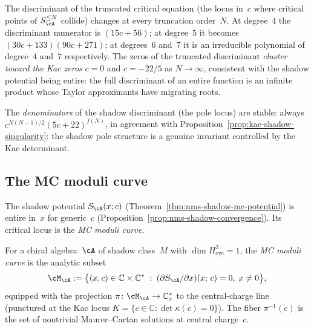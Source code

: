 \begin{remark}
\label{rem:nms-discriminant-instability}%
%
The discriminant of the truncated critical equation (the locus
in~$c$ where critical points of $S_{\cA}^{\leq N}$ collide)
changes at every truncation order~$N$. At degree~$4$ the discriminant
numerator is $(15c + 56)$; at degree~$5$ it becomes
$(30c + 133)(90c + 271)$; at degrees~$6$ and~$7$ it is an
irreducible polynomial of degree~$4$ and~$7$ respectively.
The zeros of the truncated discriminant \emph{cluster toward
the Kac zeros} $c = 0$ and $c = -22/5$ as $N \to \infty$,
consistent with the shadow potential being entire: the full
discriminant of an entire function is an infinite product whose
Taylor approximants have migrating roots.

The \emph{denominators} of the shadow discriminant (the pole locus)
are stable: always $c^{N(N-1)/2} (5c+22)^{f(N)}$, in agreement with
Proposition~\ref{prop:kac-shadow-singularity}: the shadow pole
structure is a genuine invariant controlled by the Kac determinant.
\end{remark}


\subsection{The MC moduli curve}\label{sec:nms-mc-moduli-curve}

The shadow potential $S_{\cA}(x;c)$
(Theorem~\ref{thm:nms-shadow-mc-potential})
is entire in~$x$ for
generic~$c$
(Proposition~\ref{prop:nms-shadow-convergence}).
Its critical locus is the \emph{MC moduli curve}.

\begin{definition}
\label{def:nms-mc-moduli-curve}%
%
%
For a chiral algebra~$\cA$ of shadow class~$M$ with
$\dim H^2_{\mathrm{cyc}} = 1$, the \emph{MC moduli curve} is the
analytic subset
\[
\cM_{\cA}
:=
\bigl\{(x,c) \in \mathbb{C} \times \mathbb{C}^*
\;:\;
(\partial S_{\cA}/\partial x)(x;\,c) = 0,\;
x \neq 0
\bigr\},
\]
equipped with the projection $\pi \colon \cM_{\cA} \to \mathbb{C}^*_c$
to the central-charge line (punctured at the Kac locus
$K = \{c \in \mathbb{C} : \det \kappa(c) = 0\}$).
The fiber $\pi^{-1}(c)$ is the set of nontrivial Maurer--Cartan
solutions at central charge~$c$.
\end{definition}

